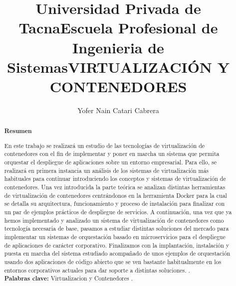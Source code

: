 \documentclass[%
 reprint,
 amsmath,amssymb,
 aps,
]{revtex4-1}
\begin{document}
\title{Universidad Privada de Tacna}
\title{Escuela Profesional de Ingenieria de Sistemas}
\title{VIRTUALIZACIÓN Y CONTENEDORES}
\author{Yofer Nain Catari Cabrera}

%

\begin{abstract}
\begin{center}
\textbf{Resumen}
\end{center}
En este trabajo se realizará un estudio de las tecnologías de virtualización de
contenedores con el fin de implementar y poner en marcha un sistema que permita
orquestar el despliegue de aplicaciones sobre un entorno empresarial.
Para ello, se realizará en primera instancia un análisis de los sistemas de virtualización
más habituales para continuar introduciendo los conceptos y sistemas de virtualización
de contenedores. Una vez introducida la parte teórica se analizan distintas
herramientas de virtualización de contenedores centrándonos en la herramienta
Docker para la cual se detalla su arquitectura, funcionamiento y proceso de instalación
para finalizar con un par de ejemplos prácticos de despliegue de servicios.
A continuación, una vez que ya hemos implementado y analizado un sistema de
virtualización de contenedores como tecnología necesaria de base, pasamos a
estudiar distintas soluciones del mercado para implementar un sistemas de
orquestación basado en microservicios para el despliegue de aplicaciones de carácter
corporativo. Finalizamos con la implantación, instalación y puesta en marcha del
sistema estudiado acompañado de unos ejemplos de orquestación usando dos
aplicaciones de código abierto que se ven bastante habitualmente en los entornos
corporativos actuales para dar soporte a distintas soluciones.
.\\
\textbf{Palabras clave:}   Virtualizacion y Contenedores .\\


\end{abstract}
\end{document}
